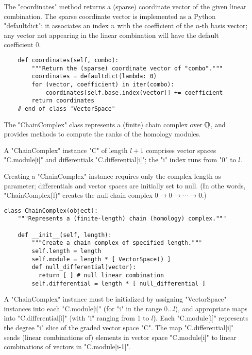 The "coordinates" method returns a (sparse) coordinate vector of the
given linear combination.  The sparse coordinate vector is implemented
as a Python "defaultdict":  it associates an index $n$ with the
coefficient of the $n$-th basis vector; any vector not appearing in
the linear combination will have the default coefficient $0$.
\begin{lstlisting}
    def coordinates(self, combo):
        """Return the (sparse) coordinate vector of "combo"."""
        coordinates = defaultdict(lambda: 0) 
        for (vector, coefficient) in iter(combo):
            coordinates[self.base.index(vector)] += coefficient
        return coordinates
    # end of class "VectorSpace"

\end{lstlisting}

The "ChainComplex" class represents a (finite) chain complex over
$\mathbb{Q}$, and provides methods to compute the ranks of the homology
modules.

A "ChainComplex" instance "C" of length $l+1$ comprises vector spaces
"C.module[i]" and differentials "C.differential[i]"; the "i" index
runs from "0" to $l$.  

Creating a "ChainComplex" instance requires only the complex length as
parameter; differentials and vector spaces are initially set to null.
(In othe words, "ChainComplex(l)" creates the null chain complex $0
\to 0 \to \cdots \to 0$.)
\begin{lstlisting}
class ChainComplex(object):
    """Represents a (finite-length) chain (homology) complex."""

    def __init__(self, length):
        """Create a chain complex of specified length."""
        self.length = length
        self.module = length * [ VectorSpace() ]
        def null_differential(vector):
          return [ ] # null linear combination
        self.differential = length * [ null_differential ]

\end{lstlisting}
A "ChainComplex" instance must be initialized by assigning
"VectorSpace" instances into each "C.module[i]" (for "i" in the range
$0 \ldots l$), and appropriate maps into "C.differential[i]" (with "i"
ranging from 1 to $l$).  Each "C.module[i]" represents the degree "i"
slice of the graded vector space "C".  The map "C.differential[i]"
sends (linear combinations of) elements in vector space "C.module[i]"
to linear combinations of vectors in "C.module[i-1]".

